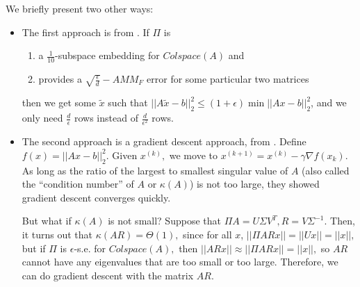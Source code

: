 \documentclass[11pt]{article}
\begin{document}
We briefly present two other ways:

\begin{itemize}
\item The first approach is from \cite{Sarlos}.  If $\Pi$ is 
\begin{enumerate}
    \item a $\frac{1}{10}$-subspace embedding for $Colspace(A)$ and
    \item provides a $\sqrt{\frac{\epsilon}{d}}-AMM_F$ error for some particular two matrices
\end{enumerate}

then we get some $\tilde{x}$ such that $||A\tilde{x} - b||_2^2 \le (1+\epsilon) \min ||Ax-b||_2^2$, and we only need $\frac{d}{\epsilon}$ rows instead of $\frac{d}{\epsilon^2}$ rows.

\item The second approach is a gradient descent approach, from \cite{RokhlinTygert} \cite{AvronMaymounkovToledo} \cite{ClarksonWoodruff}.  Define $f(x) = ||Ax-b||_2^2.$  Given $x^{(k)},$ we move to $x^{(k+1)} = x^{(k)} - \gamma \nabla f(x_k).$  As long as the ratio of the largest to smallest singular value of $A$ (also called the ``condition number'' of $A$ or $\kappa(A)$) is not too large, they showed gradient descent converges quickly.

But what if $\kappa(A)$ is not small?  Suppose that $\Pi A = U \Sigma V^T, R = V \Sigma^{-1}$.  Then, it turns out that $\kappa(AR) = \Theta(1),$ since for all $x$, $||\Pi A R x|| = ||U x|| = ||x||,$ but if $\Pi$ is $\epsilon$-s.e. for $Colspace(A),$ then $||ARx|| \approx ||\Pi A R x|| = ||x||,$ so $AR$ cannot have any eigenvalues that are too small or too large.  Therefore, we can do gradient descent with the matrix $AR$.

\end{itemize}


\end{document}
